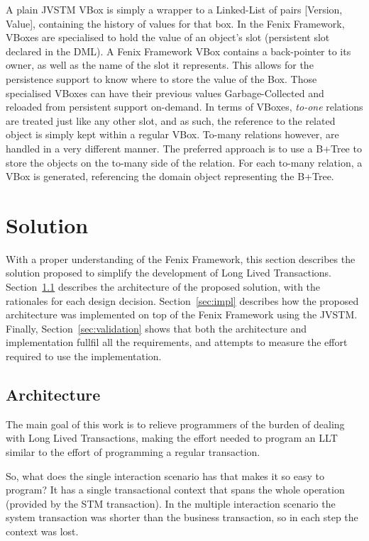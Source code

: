 \documentclass{llncs}
\begin{document}
A plain JVSTM VBox is simply a wrapper to a Linked-List of pairs
[Version, Value], containing the history of values for that box. In
the Fenix Framework, VBoxes are specialised to hold the value of an
object's slot (persistent slot declared in the DML). A Fenix Framework
VBox contains a back-pointer to its owner, as well as the name of the
slot it represents. This allows for the persistence support to know
where to store the value of the Box.  Those specialised VBoxes can
have their previous values Garbage-Collected and reloaded from
persistent support on-demand. In terms of VBoxes, {\it to-one}
relations are treated just like any other slot, and as such, the
reference to the related object is simply kept within a regular
VBox. To-many relations however, are handled in a very different
manner. The preferred approach is to use a B+Tree
\cite{elmasri2009fundamentals} to store the objects on the to-many
side of the relation. For each to-many relation, a VBox is generated,
referencing the domain object representing the B+Tree.


\section{Solution}
\label{chap:solution}

With a proper understanding of the Fenix Framework, this section
describes the solution proposed to simplify the development of Long
Lived Transactions. Section~\ref{sec:arch} describes the architecture
of the proposed solution, with the rationales for each design
decision. Section~\ref{sec:impl} describes how the proposed
architecture was implemented on top of the Fenix Framework using the
JVSTM. Finally, Section~\ref{sec:validation} shows that both the
architecture and implementation fullfil all the requirements, and
attempts to measure the effort required to use the implementation.

\subsection{Architecture}
\label{sec:arch}

The main goal of this work is to relieve programmers of the burden of
dealing with Long Lived Transactions, making the effort needed to
program an LLT similar to the effort of programming a regular
transaction.

So, what does the single interaction scenario has that makes it so
easy to program? It has a single transactional context that spans the
whole operation (provided by the STM transaction). In the multiple
interaction scenario the system transaction was shorter than the
business transaction, so in each step the context was lost.
\end{document}
